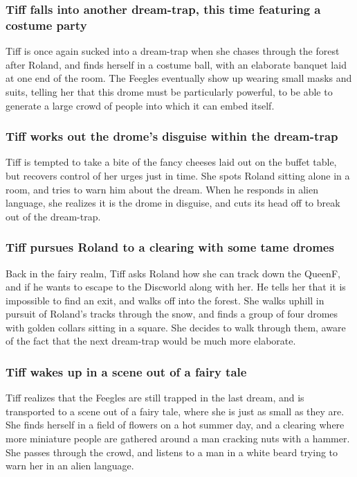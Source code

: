 \subsubsection{\Gls{Tiff} falls into another dream-trap, this time featuring a costume party}
\Gls{Tiff} is once again sucked into a dream-trap when she chases through the forest after
\Gls{Roland}, and finds herself in a costume ball, with an elaborate banquet laid at one end of the
room. The Feegles eventually show up wearing small masks and suits, telling her that this drome must
be particularly powerful, to be able to generate a large crowd of people into which it can embed
itself.

\subsubsection{\Gls{Tiff} works out the drome's disguise within the dream-trap}
\Gls{Tiff} is tempted to take a bite of the fancy cheeses laid out on the buffet table, but recovers
control of her urges just in time. She spots \Gls{Roland} sitting alone in a room, and tries to warn
him about the dream. When he responds in alien language, she realizes it is the drome in disguise,
and cuts its head off to break out of the dream-trap.

\subsubsection{\Gls{Tiff} pursues \Gls{Roland} to a clearing with some tame dromes}
Back in the fairy realm, \Gls{Tiff} asks \Gls{Roland} how she can track down the \Gls{QueenF}, and
if he wants to escape to the Discworld along with her. He tells her that it is impossible to find
an exit, and walks off into the forest. She walks uphill in pursuit of \Gls{Roland}'s tracks
through the snow, and finds a group of four dromes with golden collars sitting in a square. She
decides to walk through them, aware of the fact that the next dream-trap would be much more
elaborate.

\subsubsection{\Gls{Tiff} wakes up in a scene out of a fairy tale}
\Gls{Tiff} realizes that the Feegles are still trapped in the last dream, and is transported to a
scene out of a fairy tale, where she is just as small as they are. She finds herself in a field of
flowers on a hot summer day, and a clearing where more miniature people are gathered around a man
cracking nuts with a hammer. She passes through the crowd, and listens to a man in a white beard
trying to warn her in an alien language.


